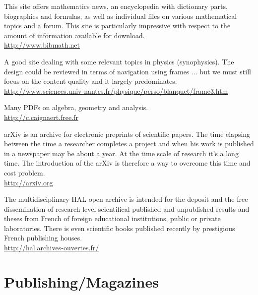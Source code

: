 	{\Large {}}{\Large {}}{\Large {}}\bcdfrance{} This site offers mathematics news, an encyclopedia with dictionary parts, biographies and formulas, as well as individual files on various mathematical topics and a forum. This site is particularly impressive with respect to the amount of information available for download. \\
	\href{http://www.bibmath.net}{\color{blue} http://www.bibmath.net} 
	
	{\Large {}}{\Large {}}\bcdfrance{} A good site dealing with some relevant topics in physics (synophysics). The design could be reviewed in terms of navigation using frames ... but we must still focus on the content quality and it largely predominates.\\
	\href{http://www.sciences.univ-nantes.fr/physique/perso/blanquet/frame3.htm}{\color{blue} http://www.sciences.univ-nantes.fr/physique/perso/blanquet/frame3.htm}
	
	{\Large {}}{\Large {}}{\Large {}}\bcdfrance{} Many PDFs on algebra, geometry and analysis.\\
	\href{http://c.caignaert.free.fr}{\color{blue} http://c.caignaert.free.fr}
	
	{\Large {}}{\Large {}}{\Large {}} arXiv is an archive for electronic preprints of scientific papers. The time elapsing between the time a researcher completes a project and when his work is published in a newspaper may be about a year. At the time scale of research it's a long time. The introduction of the arXiv is therefore a way to overcome this time and cost problem.\\
	\href{http://arxiv.org}{\color{blue} http://arxiv.org}
	
	{\Large {}}{\Large {}}{\Large {}}\bcdfrance{} The multidisciplinary HAL open archive is intended for the deposit and the free dissemination of research level scientifical published and unpublished results and theses from French of foreign educational institutions, public or private laboratories. There is even scientific books published recently by prestigious French publishing houses.\\
	\href{http://hal.archives-ouvertes.fr/}{\color{blue} http://hal.archives-ouvertes.fr/}
	
	\pagebreak
	\section{Publishing/Magazines}

